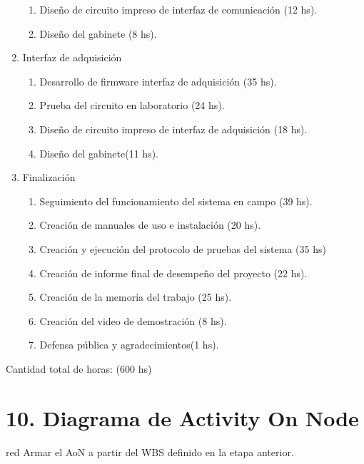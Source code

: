 \documentclass[
11pt, %
]{charter}
\begin{document}
\begin{enumerate}
\begin{enumerate}
	\item Diseño de circuito impreso de interfaz de comunicación (12 hs).
	\item Diseño del gabinete (8 hs).
	\end{enumerate}
\item Interfaz de adquisición 
	\begin{enumerate}
	\item Desarrollo de firmware interfaz de adquisición (35 hs).
	\item Prueba del circuito en laboratorio (24 hs).
	\item Diseño de circuito impreso de interfaz de adquisición (18 hs).
	\item Diseño del gabinete(11 hs).
	\end{enumerate}
\item Finalización 
	\begin{enumerate}
	\item Seguimiento del funcionamiento del sistema en campo (39 hs).
	\item Creación de manuales de uso e instalación (20 hs).
	\item Creación y ejecución del protocolo de pruebas del sistema (35 hs)
	\item Creación de informe final de desempeño del proyecto (22 hs).
	\item Creación de la memoria del trabajo (25 hs).
	\item Creación del video de demostración (8 hs).
	\item Defensa pública y agradecimientos(1 hs).
	\end{enumerate}
\end{enumerate}

Cantidad total de horas: (600 hs)

\section{10. Diagrama de Activity On Node}
\label{sec:AoN}

\begin{consigna}{red}
Armar el AoN a partir del WBS definido en la etapa anterior. 



\end{consigna}
\end{document}
